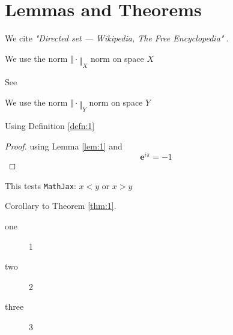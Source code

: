 \section[L and T]{Lemmas and Theorems}

We cite \emph{"Directed set --- {Wikipedia}{,} The Free Encyclopedia"} \cite{enwiki:1103032969}.

\begin{Lem}[A Lemma]\label{lem:1}
  We use the norm  $‖\cdot‖_X$ norm on space \(X\)
  
  \lipsum[3]

  See \cite{wiki:it:tautol}
\end{Lem}

\begin{Theorem}\label{thm:1}


  
  We use the norm  $‖\cdot‖_Y$ norm on space \(Y\)

  
  Using Definition \ref{defn:1} \\
  \lipsum[4]
  \begin{proof}
    using Lemma \ref{lem:1} and
    \begin{equation}
      \label{eq:1}
      {\mathbf{e}}^{i \pi }=-1
    \end{equation}
  \end{proof}
  This tests \texttt{MathJax}: $x<y$ or $x>y$
\end{Theorem}

\lipsum[5]

\begin{Cor}\label{cor:1}
  Corollary to Theorem \ref{thm:1}.
  \\
  \lipsum[6]
\end{Cor}

\begin{description}
\item[one] 1
\item[two] 2 %
\item[three] 3
\end{description}


